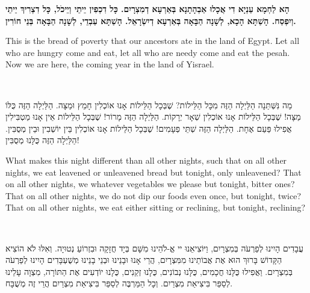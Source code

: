 

{\bfseries
הָא לַחְמָא עַנְיָא דִי אֲכָלוּ אַבְהָתָנָא בְּאַרְעָא דְמִצְרָיִם. כָּל דִכְפִין יֵיתֵי וְיֵיכֹל, כָּל דִצְרִיךְ יֵיתֵי וְיִפְסַח. הָשַׁתָּא הָכָא, לְשָׁנָה הַבָּאָה בְּאַרְעָא דְיִשְׂרָאֵל. הָשַׁתָּא עַבְדֵי, לְשָׁנָה הַבָּאָה בְּנֵי חוֹרִין.
}

\begin{english}
This is the bread of poverty that our ancestors ate in the land of Egypt. Let all who are hungry come and eat, let all who are needy come and eat the pesah. Now we are here, the coming year in the land of Yisrael.
\end{english}

\ \\



מַה נִּשְּׁתַּנָה הַלַּיְלָה הַזֶּה מִכָּל הַלֵּילוֹת? 
שֶׁבְּכָל הַלֵּילוֹת אָנוּ אוֹכְלִין חָמֵץ וּמַצָּה. הַלַּיְלָה הַזֶּה כֻּלּוֹ מַצָּה!
שֶׁבְּכָל הַלֵּילוֹת אָנוּ אוֹכְלִין שְׁאָר יְרָקוֹת. הַלַּיְלָה הַזֶּה מָרוֹר!
שֶׁבְּכָל הַלֵּילוֹת אֵין אָנוּ מַטְבִּילִין אֲפִילוּ פַּעַם אֶחָת. הַלַּיְלָה הַזֶּה שְׁתֵּי פְעָמִים!
שֶׁבְּכָל הַלֵּילוֹת אָנוּ אוֹכְלִין בֵּין יוֹשְׁבִין וּבֵין מְסֻבִּין. הַלַּיְלָה הַזֶּה כֻּלָּנוּ מְסֻבִּין!

\begin{english}
What makes this night different than all other nights, such that on all other nights, we eat leavened or unleavened bread but tonight, only unleavened? That on all other nights, we whatever vegetables we please but tonight, bitter ones? That on all other nights, we do not dip our foods even once, but tonight, twice? That on all other nights, we eat either sitting or reclining, but tonight, reclining?
\end{english}

\ \\


עֲבָדִים הָיִינוּ לְפַרְעֹה בְּמִצְרָיִם, וַיּוֹצִיאֵנוּ יי אֱ-לֹהֵינוּ מִשָּׁם בְּיָד חֲזָקָה וּבִזְרוֹעַ נְטוּיָה. וְאִלּוּ לֹא הוֹצִיא הַקָּדוֹשׁ בָּרוּךְ הוּא אֶת אֲבוֹתֵינוּ מִמִּצְרָיִם, הֲרֵי אָנוּ וּבָנֵינוּ וּבְנֵי בָנֵינוּ מְשֻׁעְבָּדִים הָיִינוּ לְפַרְעֹה בְּמִצְרָיִם. וַאֲפִילוּ כֻּלָּנוּ חֲכָמִים, כֻּלָּנוּ נְבוֹנִים, כֻּלָנוּ זְקֵנִים, כֻּלָנוּ יוֹדְעִים אֶת הַתּוֹרָה, מִצְוָה עָלֵינוּ לְסַפֵּר בִּיצִיאַת מִצְרַיִם. וְכָל הַמַּרְבֶּה לְסַפֵּר בִּיצִיאַת מִצְרַיִם הֲרֵי זֶה מְשֻׁבָּח.

